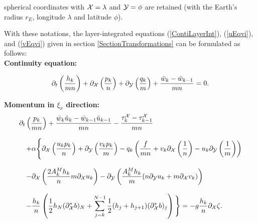 spherical coordinates with ${\cal X}=\lambda$\label{lambda}
and ${\cal Y}=\phi$
are retained 
(with the Earth's radius $r_E$, longitude $\lambda$ and
latitude $\phi$). 

With these notations, the layer-integrated equations 
(\ref{ContiLayerInt}), (\ref{uEqvi}), and (\ref{vEqvi}) given
in section \ref{SectionTransformations} can be formulated as 
follows: \\ 

{\bf Continuity equation:} 

\begin{equation}\label{ContiLayerIntCurvi}
\partial_t \left(\frac{h_k}{mn}\right) 
+ \partial_{\cal X} \left(\frac{p_k}{n} \right)
+ \partial_{\cal Y} \left(\frac{q_k}{m} \right)
+ \frac{\bar w_k - \bar w_{k-1}}{mn}=0.
\end{equation}

{\bf Momentum in $\xi_x$ direction:} 
\begin{equation}\label{uEqviCurvi}
\begin{array}{l}
\displaystyle 
\partial_t \left(\frac{p_k}{mn}\right)  
+\frac{\bar w_k \tilde u_k -\bar w_{k-1} \tilde u_{k-1}}{mn}  
-\frac{\tau^{\cal X}_k - \tau^{\cal X}_{k-1}}{mn}  
\\ \\ \quad
\displaystyle 
+\alpha\Bigg\{\partial_{\cal X}\left(\frac{u_kp_k}{n}\right)
+\partial_{\cal Y}\left(\frac{v_kp_k}{m}\right)
- q_k \left(\frac{f}{mn}+v_k\partial_{\cal X}\left(\frac{1}{n}\right)
-u_k\partial_{\cal Y}\left(\frac{1}{m}\right) \right)  
\\ \\ \quad
\displaystyle
-\partial_{\cal X}\left(\frac{2A_k^Mh_k}{n} m\partial_{\cal X}u_k\right)
-\partial_{\cal Y}\left(\frac{A_k^Mh_k}{m}
(n\partial_{\cal Y}u_k+m\partial_{\cal X}v_k)\right)
\\ \\ \quad
\displaystyle
-\frac{h_k}{n}\left(
\frac12h_N(\partial^*_{\cal X}b)_N
+\sum_{j=k}^{N-1}\frac12(h_j+h_{j+1})(\partial^*_{\cal X}b)_j
\right)\Bigg\}
=
-g\frac{h_k}{n}\partial_{\cal X}\zeta.
\end{array}
\end{equation}

